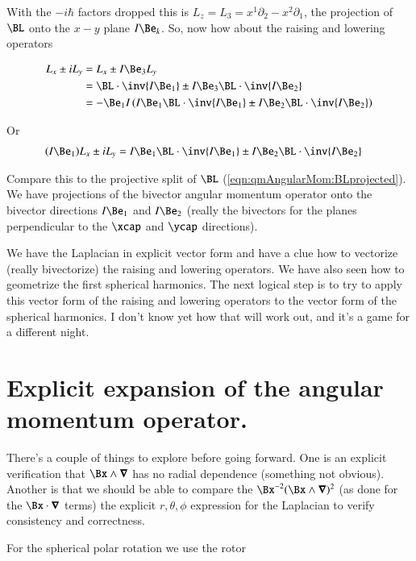 With the $-i\hbar$ factors dropped this is $L_z = L_3 = x^1 \partial_2 - x^2 \partial_1$, the projection of $\BL$ onto the $x-y$ plane $I \Be_k$.  So, now how about the raising and lowering operators

\begin{align*}
L_x \pm i L_y
&=
L_x \pm I \Be_3 L_y \\
&=
\BL \cdot \inv{I\Be_1} \pm I \Be_3 \BL \cdot \inv{I\Be_2} \\
&=
-\Be_1 I \left( I \Be_1 \BL \cdot \inv{I\Be_1} \pm I \Be_2 \BL \cdot \inv{I\Be_2} \right) \\
\end{align*}

Or
\begin{align}\label{eqn:qmAngularMom:raisingLoweringBivector}
(I \Be_1) L_x \pm i L_y &= I \Be_1 \BL \cdot \inv{I\Be_1} \pm I \Be_2 \BL \cdot \inv{I\Be_2} 
\end{align}

Compare this to the projective split of $\BL$ (\ref{eqn:qmAngularMom:BLprojected}).  We have projections of the bivector angular momentum operator onto the bivector directions $I\Be_1$ and $I\Be_2$ (really the bivectors for the planes perpendicular to the $\xcap$ and $\ycap$ directions).

We have the Laplacian in explicit vector form and have a clue how to vectorize (really bivectorize) the raising and lowering operators.  We have also seen how to geometrize the first spherical harmonics.  The next logical step is to try to apply this vector form of the raising and lowering operators to the vector form of the spherical harmonics.  I don't know yet how that will work out, and it's a game for a different night.

\section{Explicit expansion of the angular momentum operator.}

There's a couple of things to explore before going forward.  One is an explicit verification that $\Bx \wedge \spacegrad$ has no radial dependence (something not obvious).  Another is that we should be able to compare the $\Bx^{-2} (\Bx \wedge \spacegrad)^2$ (as done for the $\Bx \cdot \spacegrad$ terms) the explicit $r,\theta,\phi$ expression for the Laplacian to verify consistency and correctness.

For the spherical polar rotation we use the rotor

